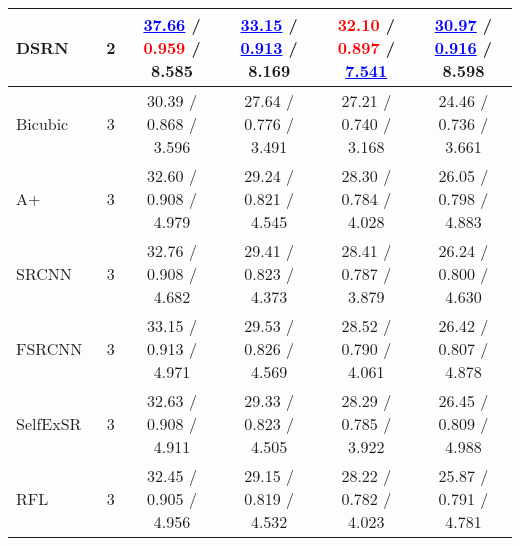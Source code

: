 \documentclass[10pt,twocolumn,letterpaper]{article}
\def\red#1{\textcolor{red}{#1}}
\def\blue#1{\textcolor{blue}{#1}}
\newcommand{\algname}{DSRN }
\begin{document}
\begin{table*}[t]
\begin{tabular}{lccccc}
\algname                           & 2                      & \blue{\underline{37.66}} / \red{\bf 0.959} / 8.585                             & \blue{\underline{33.15}} / \blue{\underline{0.913}} / 8.169                    & \red{\bf 32.10} / \red{\bf 0.897} / \blue{\underline{7.541}}               & \blue{\underline{30.97}} / \blue{\underline{0.916}} / 8.598                    \\ \hline
Bicubic                            & 3                      & 30.39 / 0.868 / 3.596                                                          & 27.64 / 0.776 / 3.491                                                          & 27.21 / 0.740 / 3.168                                                      & 24.46 / 0.736 / 3.661                                                          \\
A+~\cite{timofte2014a+}            & 3                      & 32.60 / 0.908 / 4.979                                                          & 29.24 / 0.821 / 4.545                                                          & 28.30 / 0.784 / 4.028                                                      & 26.05 / 0.798 / 4.883                                                          \\
SRCNN~\cite{dong2014learning}      & 3                      & 32.76 / 0.908 / 4.682                                                          & 29.41 / 0.823 / 4.373                                                          & 28.41 / 0.787 / 3.879                                                      & 26.24 / 0.800 / 4.630                                                          \\
FSRCNN~\cite{dong2016accelerating} & 3                      & 33.15 / 0.913 / 4.971                                                          & 29.53 / 0.826 / 4.569                                                          & 28.52 / 0.790 / 4.061                                                      & 26.42 / 0.807 / 4.878                                                          \\
SelfExSR~\cite{huang2015single}    & 3                      & 32.63 / 0.908 / 4.911                                                          & 29.33 / 0.823 / 4.505                                                          & 28.29 / 0.785 / 3.922                                                      & 26.45 / 0.809 / 4.988                                                          \\
RFL~\cite{schulter2015fast}        & 3                      & 32.45 / 0.905 / 4.956                                                          & 29.15 / 0.819 / 4.532                                                          & 28.22 / 0.782 / 4.023                                                      & 25.87 / 0.791 / 4.781                                                          \\

\end{tabular}
\end{table*}
\end{document}
